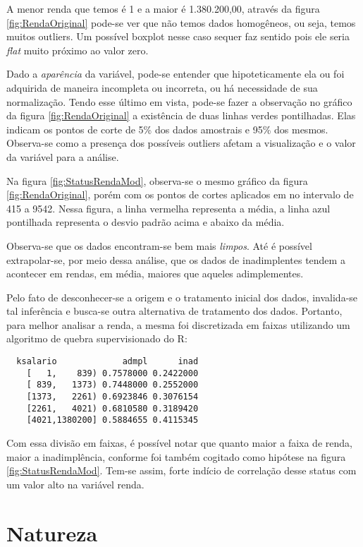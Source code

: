 A menor renda que temos é 1 e a maior é 1.380.200,00, através da figura \ref{fig:RendaOriginal}
pode-se ver que não temos dados homogêneos, ou seja, temos muitos outliers. Um possível boxplot nesse caso sequer faz sentido
pois ele seria \emph{flat} muito próximo ao valor zero.

Dado a \emph{aparência} da variável, pode-se entender que hipoteticamente ela ou foi adquirida de maneira incompleta ou 
incorreta, ou há necessidade de sua normalização. Tendo esse último em vista, pode-se fazer a observação no gráfico da figura 
\ref{fig:RendaOriginal} a existência de duas linhas verdes pontilhadas. Elas indicam os pontos de corte de 5\% dos dados amostrais e 95\% dos mesmos. Observa-se como a presença dos possíveis outliers afetam a visualização e o valor da variável para a análise.

Na figura \ref{fig:StatusRendaMod}, observa-se o mesmo gráfico da figura \ref{fig:RendaOriginal}, porém com os pontos de cortes aplicados em no intervalo de 415 a 9542. Nessa figura, a linha vermelha representa a média, a linha azul pontilhada representa o desvio padrão acima e abaixo da média.

Observa-se que os dados encontram-se bem mais \emph{limpos}. Até é possível extrapolar-se, por meio dessa análise, que os dados de inadimplentes tendem a acontecer em rendas, em média, maiores que aqueles adimplementes. 

Pelo fato de desconhecer-se a origem e o tratamento inicial dos dados, invalida-se tal inferência e busca-se outra alternativa de tratamento dos dados. Portanto, para melhor analisar a renda, a mesma foi discretizada em faixas utilizando
um algoritmo de quebra supervisionado do R:

\begin{lstlisting}
  ksalario             admpl      inad
    [   1,    839) 0.7578000 0.2422000
    [ 839,   1373) 0.7448000 0.2552000
    [1373,   2261) 0.6923846 0.3076154
    [2261,   4021) 0.6810580 0.3189420
    [4021,1380200] 0.5884655 0.4115345
\end{lstlisting}

Com essa divisão em faixas, é possível notar que quanto maior a faixa
de renda, maior a inadimplência, conforme foi também cogitado como hipótese na 
figura \ref{fig:StatusRendaMod}. Tem-se assim, forte indício de correlação desse status com um valor alto na variável renda.

\section{Natureza}


